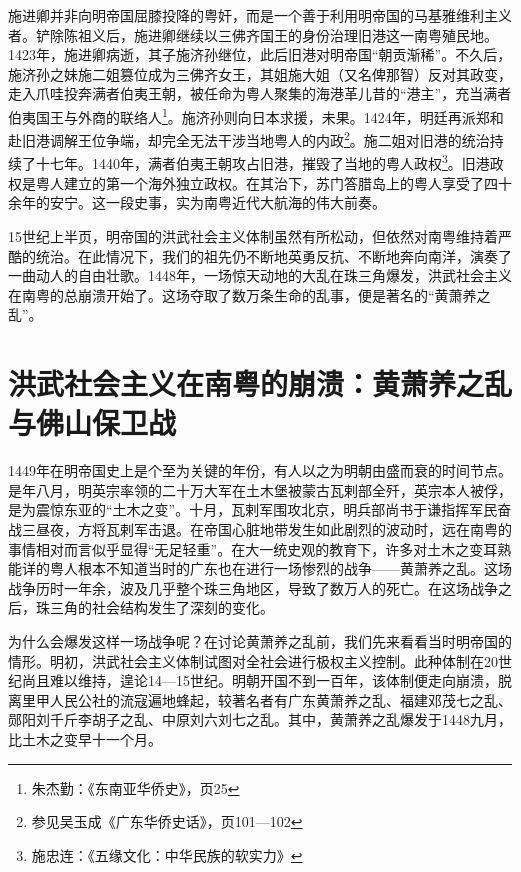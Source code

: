 施进卿并非向明帝国屈膝投降的粤奸，而是一个善于利用明帝国的马基雅维利主义者。铲除陈祖义后，施进卿继续以三佛齐国王的身份治理旧港这一南粤殖民地。1423年，施进卿病逝，其子施济孙继位，此后旧港对明帝国“朝贡渐稀”。不久后，施济孙之妹施二姐篡位成为三佛齐女王，其姐施大姐（又名俾那智）反对其政变，走入爪哇投奔满者伯夷王朝，被任命为粤人聚集的海港革儿昔的“港主”，充当满者伯夷国王与外商的联络人\footnote{朱杰勤：《东南亚华侨史》，页25}。施济孙则向日本求援，未果。1424年，明廷再派郑和赴旧港调解王位争端，却完全无法干涉当地粤人的内政\footnote{参见吴玉成《广东华侨史话》，页101—102}。施二姐对旧港的统治持续了十七年。1440年，满者伯夷王朝攻占旧港，摧毁了当地的粤人政权\footnote{施忠连：《五缘文化：中华民族的软实力》}。旧港政权是粤人建立的第一个海外独立政权。在其治下，苏门答腊岛上的粤人享受了四十余年的安宁。这一段史事，实为南粤近代大航海的伟大前奏。

15世纪上半页，明帝国的洪武社会主义体制虽然有所松动，但依然对南粤维持着严酷的统治。在此情况下，我们的祖先仍不断地英勇反抗、不断地奔向南洋，演奏了一曲动人的自由壮歌。1448年，一场惊天动地的大乱在珠三角爆发，洪武社会主义在南粤的总崩溃开始了。这场夺取了数万条生命的乱事，便是著名的“黄萧养之乱”。

\section{洪武社会主义在南粤的崩溃：黄萧养之乱与佛山保卫战}

\indent 1449年在明帝国史上是个至为关键的年份，有人以之为明朝由盛而衰的时间节点。是年八月，明英宗率领的二十万大军在土木堡被蒙古瓦剌部全歼，英宗本人被俘，是为震惊东亚的“土木之变”。十月，瓦剌军围攻北京，明兵部尚书于谦指挥军民奋战三昼夜，方将瓦剌军击退。在帝国心脏地带发生如此剧烈的波动时，远在南粤的事情相对而言似乎显得“无足轻重”。在大一统史观的教育下，许多对土木之变耳熟能详的粤人根本不知道当时的广东也在进行一场惨烈的战争——黄萧养之乱。这场战争历时一年余，波及几乎整个珠三角地区，导致了数万人的死亡。在这场战争之后，珠三角的社会结构发生了深刻的变化。

为什么会爆发这样一场战争呢？在讨论黄萧养之乱前，我们先来看看当时明帝国的情形。明初，洪武社会主义体制试图对全社会进行极权主义控制。此种体制在20世纪尚且难以维持，遑论14—15世纪。明朝开国不到一百年，该体制便走向崩溃，脱离里甲人民公社的流寇遍地蜂起，较著名者有广东黄萧养之乱、福建邓茂七之乱、郧阳刘千斤李胡子之乱、中原刘六刘七之乱。其中，黄萧养之乱爆发于1448九月，比土木之变早十一个月。

